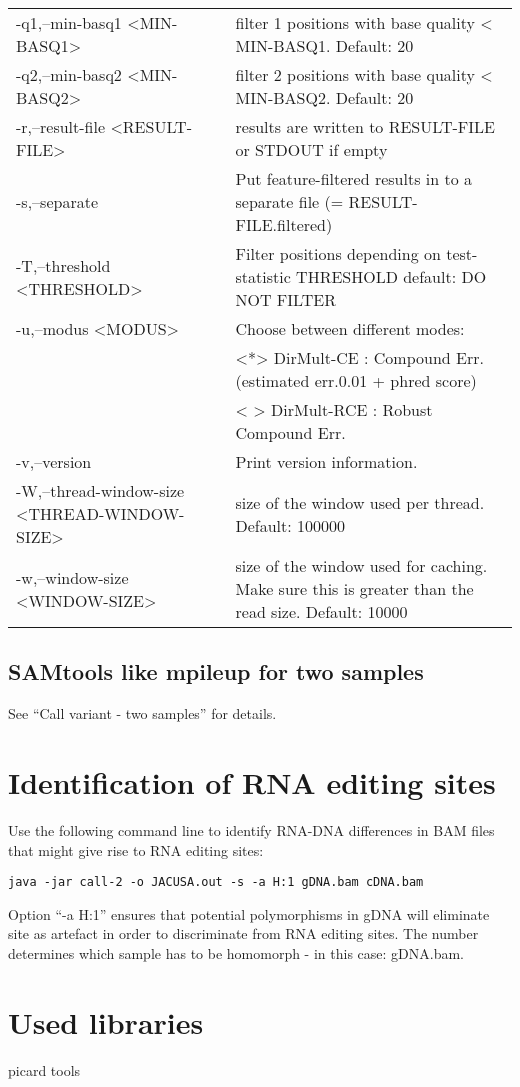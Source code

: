 \documentclass[10pt, a4paper]{article}
\begin{document}
\begin{table}
{\begin{tabular}{p{}p{}}
 -q1,--min-basq1 <MIN-BASQ1>                    & filter 1 positions with base quality < MIN-BASQ1. Default: 20 \\
 -q2,--min-basq2 <MIN-BASQ2>                    & filter 2 positions with base quality < MIN-BASQ2. Default: 20 \\
 -r,--result-file <RESULT-FILE>                 & results are written to RESULT-FILE or STDOUT if empty \\
 -s,--separate                                  & Put feature-filtered results in to a separate file (= RESULT-FILE.filtered)\\
 -T,--threshold <THRESHOLD>                     & Filter positions depending on test-statistic THRESHOLD default: DO NOT FILTER \\
 -u,--modus <MODUS>                             & Choose between different modes: \\
                                                & <*> DirMult-CE : Compound Err. (estimated err.{0.01} + phred score) \\
                                                & < > DirMult-RCE : Robust Compound Err. \\
 -v,--version                                   & Print version information. \\
 -W,--thread-window-size <THREAD-WINDOW-SIZE>   & size of the window used per thread. Default: 100000 \\
 -w,--window-size <WINDOW-SIZE>                 & size of the window used for caching. Make sure this is greater than the read size. Default: 10000
\end{tabular}}
\end{table}
\subsection{SAMtools like mpileup for two samples}
See ``Call variant - two samples'' for details.
\section{Identification of RNA editing sites}
Use the following command line to identify RNA-DNA differences in BAM files that might give rise to RNA editing sites:
\begin{verbatim}
java -jar call-2 -o JACUSA.out -s -a H:1 gDNA.bam cDNA.bam
\end{verbatim}
Option ``-a H:1'' ensures that potential polymorphisms in gDNA will eliminate site as artefact in order to discriminate from RNA editing sites. The number
determines which sample has to be homomorph - in this case: gDNA.bam.
\section{Used libraries}
picard tools
\end{document}
